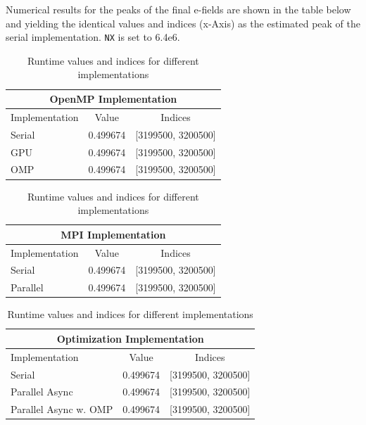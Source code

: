 \documentclass[a4paper,10pt]{article}
\begin{document}
Numerical results for the peaks of the final e-fields are shown in the table below and yielding the identical values and indices (x-Axis) as the estimated peak of the serial implementation.
\verb|NX| is set to 6.4e6.
\begin{table}[H]
  \centering
  \caption{Runtime values and indices for different implementations}
  \label{tab:5_numerical_verification}
  
  \begin{tabular}{|l|c|c|}
    \multicolumn{3}{c}{\textbf{OpenMP Implementation}} \\
    \hline
    Implementation & Value & Indices \\
    \hline
    Serial   & 0.499674 & [3199500, 3200500] \\
    GPU      & 0.499674 & [3199500, 3200500] \\
    OMP      & 0.499674 & [3199500, 3200500] \\
    \hline
  \end{tabular}
  \vspace{1em}

  \begin{tabular}{|l|c|c|}
    \multicolumn{3}{c}{\textbf{MPI Implementation}} \\
    \hline
    Implementation & Value & Indices \\
    \hline
    Serial   & 0.499674 & [3199500, 3200500] \\
    Parallel & 0.499674 & [3199500, 3200500] \\
    \hline
  \end{tabular}
  \vspace{1em}

  \begin{tabular}{|l|c|c|}
    \multicolumn{3}{c}{\textbf{Optimization Implementation}} \\
    \hline
    Implementation & Value & Indices \\
    \hline
    Serial                    & 0.499674 & [3199500, 3200500] \\
    Parallel Async            & 0.499674 & [3199500, 3200500] \\
    Parallel Async w. OMP     & 0.499674 & [3199500, 3200500] \\
    \hline
  \end{tabular}
\end{table}
\end{document}
